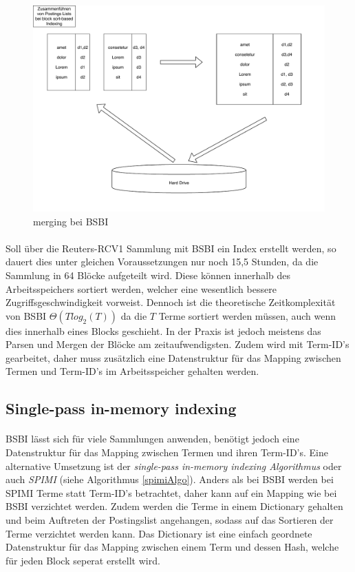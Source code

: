 \begin{figure}[ht]
  \includegraphics[width=\textwidth]{pdf/BSI_merging.pdf}
  \caption{merging bei BSBI}
  \label{bsiMerging}
\end{figure}

\paragraph{}
Soll über die Reuters-RCV1 Sammlung mit BSBI ein Index erstellt werden, so dauert dies unter gleichen Voraussetzungen nur noch 15,5 Stunden, da die Sammlung in 64 Blöcke aufgeteilt wird. Diese können innerhalb des Arbeitsspeichers sortiert werden, welcher eine wesentlich bessere Zugriffsgeschwindigkeit vorweist. Dennoch ist die theoretische Zeitkomplexität von BSBI $\Theta( T log_2 ( T))$ da die $T$ Terme sortiert werden müssen, auch wenn dies innerhalb eines Blocks geschieht. In der Praxis ist jedoch meistens das Parsen und Mergen der Blöcke am zeitaufwendigsten. Zudem wird mit Term-ID's gearbeitet,  daher muss zusätzlich eine Datenstruktur für das Mapping zwischen Termen und Term-ID's im Arbeitsspeicher gehalten werden.\par

\subsection{Single-pass in-memory indexing}
\paragraph{}
BSBI lässt sich für viele Sammlungen anwenden, benötigt jedoch eine Datenstruktur für das Mapping zwischen Termen und ihren Term-ID's. Eine alternative Umsetzung ist der \textit{single-pass in-memory indexing Algorithmus} oder auch \textit{SPIMI} (siehe Algorithmus \ref{spimiAlgo}). Anders als bei BSBI werden bei SPIMI Terme statt Term-ID's betrachtet, daher kann auf ein Mapping wie bei BSBI verzichtet werden. Zudem werden die Terme in einem Dictionary gehalten und beim Auftreten der Postingslist angehangen, sodass auf das Sortieren der Terme verzichtet werden kann. Das Dictionary ist eine einfach geordnete Datenstruktur für das Mapping zwischen einem Term und dessen Hash, welche für jeden Block seperat erstellt wird.\par

